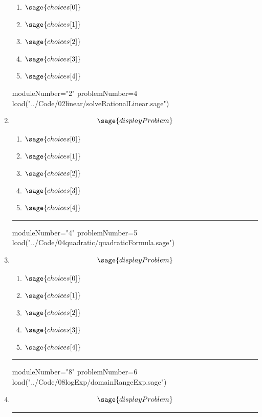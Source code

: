 \documentclass[14pt]{extbook}
\newcommand{\litem}[1]{\item#1\hspace*{-1cm}\rule{\textwidth}{0.4pt}}
\begin{document}
\begin{enumerate}
{  	\begin{enumerate}[label=\Alph*.]
    \item \( \sage{choices[0]} \)
    \item \( \sage{choices[1]} \)
    \item \( \sage{choices[2]} \)
    \item \( \sage{choices[3]} \)
    \item \( \sage{choices[4]} \)
  	\end{enumerate}
  }
\begin{sagesilent}
moduleNumber="2"
problemNumber=4
load("../Code/02linear/solveRationalLinear.sage")
\end{sagesilent}

\litem{ 

   \[ \sage{displayProblem} \]

  	\begin{enumerate}[label=\Alph*.]
    \item \( \sage{choices[0]} \)
    \item \( \sage{choices[1]} \)
    \item \( \sage{choices[2]} \)
    \item \( \sage{choices[3]} \)
    \item \( \sage{choices[4]} \)
  	\end{enumerate}
  }
\begin{sagesilent}
moduleNumber="4"
problemNumber=5
load("../Code/04quadratic/quadraticFormula.sage")
\end{sagesilent}

\litem{ 

   \[ \sage{displayProblem} \]

  	\begin{enumerate}[label=\Alph*.]
    \item \( \sage{choices[0]} \)
    \item \( \sage{choices[1]} \)
    \item \( \sage{choices[2]} \)
    \item \( \sage{choices[3]} \)
    \item \( \sage{choices[4]} \)
  	\end{enumerate}
  }
\begin{sagesilent}
moduleNumber="8"
problemNumber=6
load("../Code/08logExp/domainRangeExp.sage")
\end{sagesilent}

\litem{ 

   \[ \sage{displayProblem} \]

}
\end{enumerate}
\end{document}
